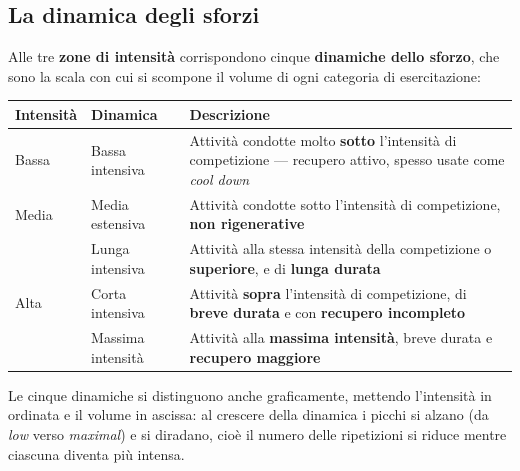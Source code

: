 \subsection{La dinamica degli sforzi}

Alle tre \textbf{zone di intensità} corrispondono cinque \textbf{dinamiche dello sforzo}, che sono
la scala con cui si scompone il volume di ogni categoria di esercitazione:

\begin{table}[htbp]
  \centering
  \small
  \renewcommand{\arraystretch}{1.3}
  \begin{tabularx}{\textwidth}{|l|l|X|}
    \hline
    \textbf{Intensità} & \textbf{Dinamica} & \textbf{Descrizione} \\
    \hline
    Bassa & Bassa intensiva & Attività condotte molto \textbf{sotto} l'intensità di competizione ---
      recupero attivo, spesso usate come \textit{cool down} \\
    \hline
    Media & Media estensiva & Attività condotte sotto l'intensità di competizione, \textbf{non
      rigenerative} \\
    \hline
    \multirow{3}{*}{Alta} & Lunga intensiva & Attività alla stessa intensità della competizione o
      \textbf{superiore}, e di \textbf{lunga durata} \\
    \cline{2-3}
     & Corta intensiva & Attività \textbf{sopra} l'intensità di competizione, di \textbf{breve
      durata} e con \textbf{recupero incompleto} \\
    \cline{2-3}
     & Massima intensità & Attività alla \textbf{massima intensità}, breve durata e
      \textbf{recupero maggiore} \\
    \hline
  \end{tabularx}
\end{table}

Le cinque dinamiche si distinguono anche graficamente, mettendo l'intensità in ordinata e il volume
in ascissa: al crescere della dinamica i picchi si alzano (da \textit{low} verso \textit{maximal}) e
si diradano, cioè il numero delle ripetizioni si riduce mentre ciascuna diventa più intensa.

